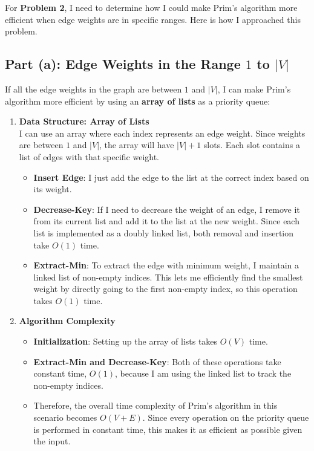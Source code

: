 \documentclass[10pt,letter,notitlepage]{article}
\begin{document}
\begin{Answer}[]

For \textbf{Problem 2}, I need to determine how I could make Prim's algorithm more efficient when edge weights are in specific ranges. Here is how I approached this problem.

\subsection*{Part (a): Edge Weights in the Range \(1\) to \(|V|\)}

If all the edge weights in the graph are between \(1\) and \(|V|\), I can make Prim’s algorithm more efficient by using an \textbf{array of lists} as a priority queue:

\begin{enumerate}
    \item \textbf{Data Structure: Array of Lists} \\
    I can use an array where each index represents an edge weight. Since weights are between \(1\) and \(|V|\), the array will have \(|V| + 1\) slots. Each slot contains a list of edges with that specific weight.
    \begin{itemize}
        \item \textbf{Insert Edge}: I just add the edge to the list at the correct index based on its weight.
        \item \textbf{Decrease-Key}: If I need to decrease the weight of an edge, I remove it from its current list and add it to the list at the new weight. Since each list is implemented as a doubly linked list, both removal and insertion take \(O(1)\) time.
        \item \textbf{Extract-Min}: To extract the edge with minimum weight, I maintain a linked list of non-empty indices. This lets me efficiently find the smallest weight by directly going to the first non-empty index, so this operation takes \(O(1)\) time.
    \end{itemize}

    \item \textbf{Algorithm Complexity} \\
    \begin{itemize}
        \item \textbf{Initialization}: Setting up the array of lists takes \(O(V)\) time.
        \item \textbf{Extract-Min and Decrease-Key}: Both of these operations take constant time, \(O(1)\), because I am using the linked list to track the non-empty indices.
        \item Therefore, the overall time complexity of Prim's algorithm in this scenario becomes \(O(V + E)\). Since every operation on the priority queue is performed in constant time, this makes it as efficient as possible given the input.
    \end{itemize}
\end{enumerate}


\end{Answer}
\end{document}
